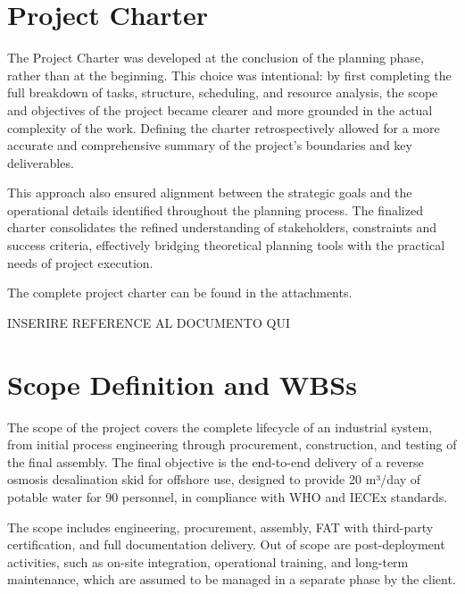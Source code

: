 \documentclass[12pt]{article}
\begin{document}
\section{Project Charter}

The Project Charter was developed at the conclusion of the planning phase, rather than at the beginning. This choice was intentional: by first completing the full breakdown of tasks, structure, scheduling, and resource analysis, the scope and objectives of the project became clearer and more grounded in the actual complexity of the work. Defining the charter retrospectively allowed for a more accurate and comprehensive summary of the project’s boundaries and key deliverables.

This approach also ensured alignment between the strategic goals and the operational details identified throughout the planning process. The finalized charter consolidates the refined understanding of stakeholders, constraints and success criteria, effectively bridging theoretical planning tools with the practical needs of project execution.

The complete project charter can be found in the attachments.

INSERIRE REFERENCE AL DOCUMENTO QUI

\section{Scope Definition and WBSs}

The scope of the project covers the complete lifecycle of an industrial system, from initial process engineering through procurement, construction, and testing of the final assembly.
The final objective is the end-to-end delivery of a reverse osmosis desalination skid for offshore use, designed to provide 20 m³/day of potable water for 90 personnel, in compliance with WHO and IECEx standards.

The scope includes engineering, procurement, assembly, FAT with third-party certification, and full documentation delivery.
Out of scope are post-deployment activities, such as on-site integration, operational training, and long-term maintenance, which are assumed to be managed in a separate phase by the client.
\end{document}
